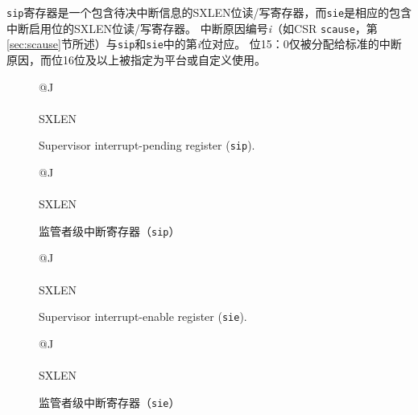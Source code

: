 {\tt sip}寄存器是一个包含待决中断信息的SXLEN位读/写寄存器，而{\tt sie}是相应的包含中断启用位的SXLEN位读/写寄存器。
中断原因编号\textit{i}（如CSR {\tt scause}，第\ref{sec:scause}节所述）与{\tt sip}和{\tt sie}中的第\textit{i}位对应。
位15：0仅被分配给标准的中断原因，而位16位及以上被指定为平台或自定义使用。

\begin{figure}[h!]
{\footnotesize
\begin{center}
\begin{tabular}{@{}J}
 \\
\hline
{} \\
\hline
SXLEN \\
\end{tabular}
\end{center}
}
\vspace{-0.1in}
\caption{Supervisor interrupt-pending register ({\tt sip}).}
\label{sipreg}
\end{figure}

\begin{figure}[h!]
{\footnotesize
\begin{center}
\begin{tabular}{@{}J}
 \\
\hline
{} \\
\hline
SXLEN \\
\end{tabular}
\end{center}
}
\vspace{-0.1in}
\caption{监管者级中断寄存器（{\tt sip}）}
\label{sipreg}
\end{figure}

\begin{figure}[h!]
{\footnotesize
\begin{center}
\begin{tabular}{@{}J}
 \\
\hline
{} \\
\hline
SXLEN \\
\end{tabular}
\end{center}
}
\vspace{-0.1in}
\caption{Supervisor interrupt-enable register ({\tt sie}).}
\label{siereg}
\end{figure}

\begin{figure}[h!]
{\footnotesize
\begin{center}
\begin{tabular}{@{}J}
 \\
\hline
{} \\
\hline
SXLEN \\
\end{tabular}
\end{center}
}
\vspace{-0.1in}
\caption{监管者级中断寄存器（{\tt sie}）}
\label{siereg}
\end{figure}

